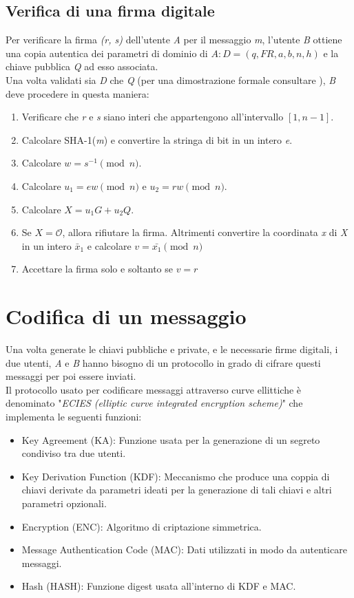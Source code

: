 \documentclass[12pt, a4paper]{report}
\begin{document}
\subsection{Verifica di una firma digitale}
Per verificare la firma \textit{(r, s)} dell'utente \textit{A} per il messaggio \textit{m}, l'utente \textit{B} ottiene una copia autentica dei parametri di dominio di $A: D = (q, FR, a, b, n, h)$ e la chiave pubblica \textit{Q} ad esso associata.
\\ Una volta validati sia \textit{D} che \textit{Q} (per una dimostrazione formale consultare \cite{Johnson}), \textit{B} deve procedere in questa maniera:
\begin{enumerate}
    \item Verificare che \textit{r} e \textit{s} siano interi che appartengono all'intervallo $[1, n - 1]$.
    \item Calcolare SHA-1(\textit{m}) e convertire la stringa di bit in un intero \textit{e}.
    \item Calcolare $w = s^{-1} \pmod n$.
    \item Calcolare $u_1 = ew \pmod n \text{ e } u_2 = rw \pmod n$.
    \item Calcolare $X = u_1G + u_2Q$.
    \item Se $X = \mathcal{O}$, allora rifiutare la firma. Altrimenti convertire la coordinata \textit{x} di \textit{X} in un intero $\bar x_1$ e calcolare $v = \bar{x_1} \pmod n$
    \item Accettare la firma solo e soltanto se $v = r$
\end{enumerate}

\section{Codifica di un messaggio}
Una volta generate le chiavi pubbliche e private, e le necessarie firme digitali, i due utenti, \textit{A} e \textit{B} hanno bisogno di un protocollo in grado di cifrare questi messaggi per poi essere inviati.
\\Il protocollo usato per codificare messaggi attraverso curve ellittiche è denominato "\textit{ECIES (elliptic curve integrated encryption scheme)}" che implementa le seguenti funzioni:
\begin{itemize}
    \item Key Agreement (KA): Funzione usata per la generazione di un segreto condiviso tra due utenti.
    \item Key Derivation Function (KDF): Meccanismo che produce una coppia di chiavi derivate da parametri ideati per la generazione di tali chiavi e altri parametri opzionali.
    \item Encryption (ENC): Algoritmo di criptazione simmetrica.
    \item Message Authentication Code (MAC): Dati utilizzati in modo da autenticare messaggi.
    \item Hash (HASH): Funzione digest usata all'interno di KDF e MAC.
\end{itemize}
\end{document}
